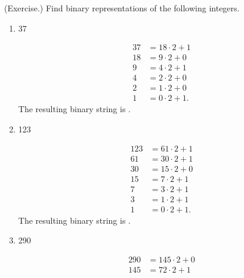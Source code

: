 \documentclass[letterpaper]{article}
\begin{document}
\begin{mdframed}
    (Exercise.) Find binary representations of the following integers. 
    \begin{enumerate}
        \item 37 
        \begin{mdframed}
            \begin{equation*}
                \begin{aligned}
                    37 &= 18 \cdot 2 + 1 \\ 
                    18 &= 9 \cdot 2 + 0 \\ 
                    9 &= 4 \cdot 2 + 1 \\ 
                    4 &= 2 \cdot 2 + 0 \\ 
                    2 &= 1 \cdot 2 + 0 \\ 
                    1 &= 0 \cdot 2 + 1.
                \end{aligned}
            \end{equation*}
            The resulting binary string is .
        \end{mdframed}
        \item 123
        \begin{mdframed}
            \begin{equation*}
                \begin{aligned}
                    123 &= 61 \cdot 2 + 1 \\ 
                    61 &= 30 \cdot 2 + 1 \\ 
                    30 &= 15 \cdot 2 + 0 \\ 
                    15 &= 7 \cdot 2 + 1 \\ 
                    7 &= 3 \cdot 2 + 1 \\ 
                    3 &= 1 \cdot 2 + 1 \\ 
                    1 &= 0 \cdot 2 + 1.
                \end{aligned}
            \end{equation*}
            The resulting binary string is .
        \end{mdframed}
        \item 290 
        \begin{mdframed}
            \begin{equation*}
                \begin{aligned}
                    290 &= 145 \cdot 2 + 0 \\ 
                    145 &= 72 \cdot 2 + 1 \\ 

\end{aligned}
\end{equation*}
\end{mdframed}
\end{enumerate}
\end{mdframed}
\end{document}
